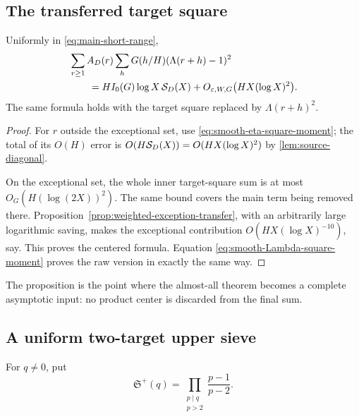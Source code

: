 \subsection{The transferred target square}

\begin{proposition}
\label{prop:weighted-target-square}
Uniformly in \eqref{eq:main-short-range},
\begin{equation}
 \begin{aligned}
 &\sum_{r\geq1}A_D(r)
 \sum_hG(h/H)(\Lambda(r+h)-1)^2\\
 &\qquad={}
 HI_0(G)\log X\,\mathcal S_D(X)
 +O_{\varepsilon,W,G}\bigl(HX(\log X)^2\bigr).
 \end{aligned}
 \label{eq:weighted-target-square}
\end{equation}
The same formula holds with the target square replaced by
$\Lambda(r+h)^2$.
\end{proposition}

\begin{proof}
For $r$ outside the exceptional set, use
\eqref{eq:smooth-eta-square-moment}; the total of its $O(H)$ error is
$O(H\mathcal S_D(X))=O(HX(\log X)^2)$ by
\cref{lem:source-diagonal}.

On the exceptional set, the whole inner target-square sum is at most
$O_G(H(\log(2X))^2)$.  The same bound covers the main term being
removed there.  Proposition~\ref{prop:weighted-exception-transfer}, with
an arbitrarily large logarithmic saving, makes the exceptional
contribution $O(HX(\log X)^{-10})$, say.  This proves the centered
formula.  Equation \eqref{eq:smooth-Lambda-square-moment} proves the raw
version in exactly the same way.
\end{proof}

The proposition is the point where the almost-all theorem becomes a
complete asymptotic input: no product center is discarded from the final
sum.

\subsection{A uniform two-target upper sieve}

For $q\ne0$, put
\begin{equation}
 \mathfrak S^+(q)=
 \prod_{\substack{p\mid q\\p>2}}\frac{p-1}{p-2}.
 \label{eq:upper-singular-factor}
\end{equation}

